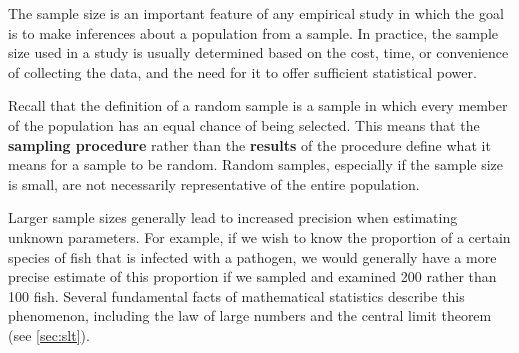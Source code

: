  The sample size is an important feature of any empirical study in which the goal is to make inferences about a population from a sample. In practice, the sample size used in a study is usually determined based on the cost, time, or convenience of collecting the data, and the need for it to offer sufficient statistical power. 
 
Recall that the definition of a random sample is a sample in which every member of the population has an equal chance of being selected. This means that the \textbf{sampling procedure} rather than the \textbf{results} of the procedure define what it means for a sample to be random. Random samples, especially if the sample size is small, are not necessarily representative of the entire population. 

Larger sample sizes generally lead to increased precision when estimating unknown parameters. For example, if we wish to know the proportion of a certain species of fish that is infected with a pathogen, we would generally have a more precise estimate of this proportion if we sampled and examined 200 rather than 100 fish. Several fundamental facts of mathematical statistics describe this phenomenon, including the law of large numbers and the central limit theorem (see \autoref{sec:slt}). 




